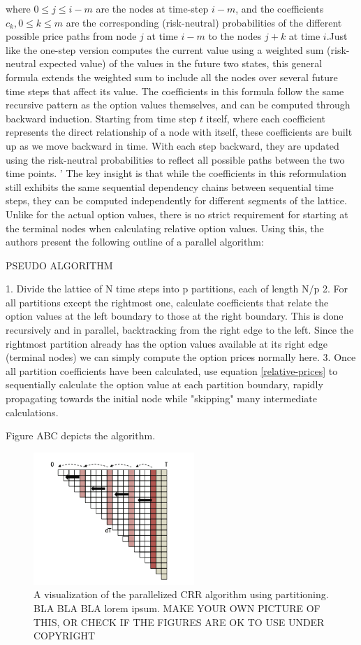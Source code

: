\documentclass[english,12pt,a4paper,pdftex,sci,utf8]{aaltothesis}
\begin{document}
where $0 \leq j \leq i-m$ are the nodes at time-step $i-m$, and the coefficients $c_k, 0 \leq k \leq m$ are the corresponding (risk-neutral) probabilities of the different possible price paths from node $j$ at time $i-m$ to the nodes $j+k$ at time $i$.Just like the one-step version computes the current value using a weighted sum (risk-neutral expected value) of the values in the future two states, this general formula extends the weighted sum to include all the nodes over several future time steps that affect its value. The coefficients in this formula follow the same recursive pattern as the option values themselves, and can be computed through backward induction. Starting from time step $t$ itself, where each coefficient represents the direct relationship of a node with itself, these coefficients are built up as we move backward in time. With each step backward, they are updated using the risk-neutral probabilities to reflect all possible paths between the two time points.
'
The key insight is that while the coefficients in this reformulation still exhibits the same sequential dependency chains between sequential time steps, they can be computed independently for different segments of the lattice. Unlike for the actual option values, there is no strict requirement for starting at the terminal nodes when calculating relative option values. Using this, the authors present the following outline of a parallel algorithm:

PSEUDO ALGORITHM

1. Divide the lattice of N time steps into p partitions, each of length N/p
2. For all partitions except the rightmost one, calculate coefficients that relate the option values at the left boundary to those at the right boundary. This is done recursively and in parallel, backtracking from the right edge to the left. Since the rightmost partition already has the option values available at its right edge (terminal nodes) we can simply compute the option prices normally here.
3. Once all partition coefficients have been calculated, use equation \eqref{relative-prices} to sequentially calculate the option value at each partition boundary, rapidly propagating towards the initial node while "skipping" many intermediate calculations.

Figure ABC depicts the algorithm.


\begin{figure}[h]
    \centering
    \includegraphics[height=5cm]{CRRpartitioned.png}
    \caption{A visualization of the parallelized CRR algorithm using partitioning. BLA BLA BLA lorem ipsum. MAKE YOUR OWN PICTURE OF THIS, OR CHECK IF THE FIGURES ARE OK TO USE UNDER COPYRIGHT}
    \label{fig:combined}
\end{figure}
\end{document}
